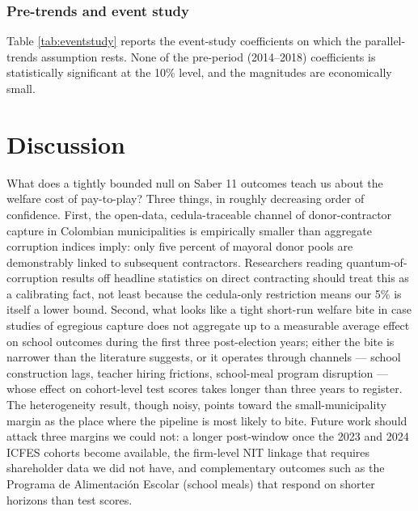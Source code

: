 \documentclass[12pt]{article}
\begin{document}
\begin{table}[h!]
\centering
\caption{Heterogeneity by municipality size}

\label{tab:het}
\end{table}

\subsubsection*{Pre-trends and event study} Table \ref{tab:eventstudy} reports the event-study coefficients on which the parallel-trends assumption rests. None of the pre-period (2014--2018) coefficients is statistically significant at the 10\% level, and the magnitudes are economically small.

\begin{table}[h!]
\centering
\caption{Event-study coefficients (2019 omitted)}

\label{tab:eventstudy}
\end{table}

\section{Discussion}

What does a tightly bounded null on Saber 11 outcomes teach us about the welfare cost of pay-to-play? Three things, in roughly decreasing order of confidence. First, the open-data, cedula-traceable channel of donor-contractor capture in Colombian municipalities is empirically smaller than aggregate corruption indices imply: only five percent of mayoral donor pools are demonstrably linked to subsequent contractors. Researchers reading quantum-of-corruption results off headline statistics on direct contracting should treat this as a calibrating fact, not least because the cedula-only restriction means our 5\% is itself a lower bound. Second, what looks like a tight short-run welfare bite in case studies of egregious capture does not aggregate up to a measurable average effect on school outcomes during the first three post-election years; either the bite is narrower than the literature suggests, or it operates through channels --- school construction lags, teacher hiring frictions, school-meal program disruption --- whose effect on cohort-level test scores takes longer than three years to register. The heterogeneity result, though noisy, points toward the small-municipality margin as the place where the pipeline is most likely to bite. Future work should attack three margins we could not: a longer post-window once the 2023 and 2024 ICFES cohorts become available, the firm-level NIT linkage that requires shareholder data we did not have, and complementary outcomes such as the Programa de Alimentaci\'on Escolar (school meals) that respond on shorter horizons than test scores.
\end{document}
